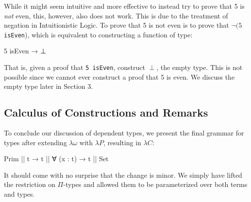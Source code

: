 \documentclass[12pt]{article}
\begin{document}
While it might seem intuitive and more effective to instead try to prove that 5
is {\em not} even, this, however, also does not work. This is due to the
treatment of negation in Intuitionistic Logic. To prove that 5 is not even is
to prove that \(\neg (5\) {\tt isEven}), which is equivalent to constructing a
function of type:
\begin{center}
\begin{minipage}{0.3\textwidth}
\begin{code}
5 isEven → ⊥
\end{code}
\end{minipage}
\end{center}
That is, given a proof that {\tt 5 isEven}, construct \(\perp\), the empty type.
This is not possible since we cannot ever construct a proof that 5 is even. We
discuss the empty type later in Section 3.

\subsection*{Calculus of Constructions and Remarks}
To conclude our discussion of dependent types, we present the final grammar for
types after extending \(\lambda\omega\) with \(\lambda P\), resulting in
\(\lambda C\):
\begin{center}
\begin{minipage}{0.6\textwidth}
\begin{code}
Prim || t → t || ∀ (x : t) → t || Set
\end{code}
\end{minipage}
\end{center}
It should come with no surprise that the change is minor. We simply have lifted
the restriction on \(\Pi\)-types and allowed them to be parameterized over both
terms and types.
\end{document}
